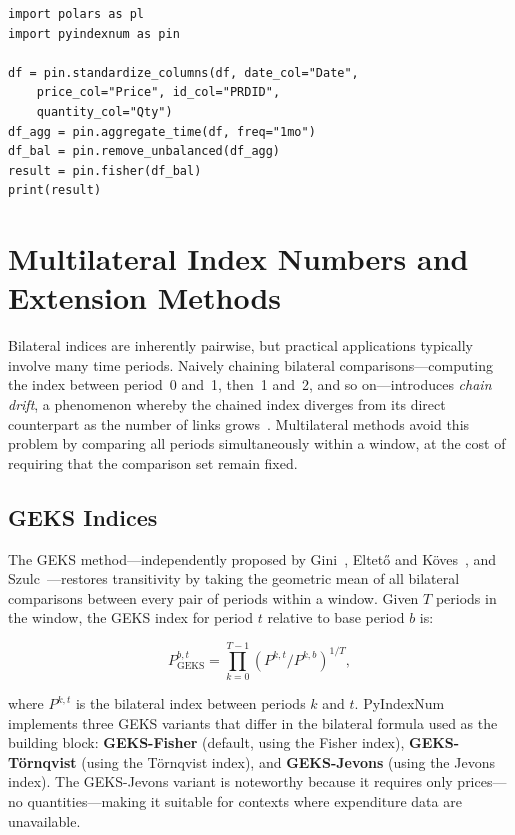 \documentclass[12pt,a4paper]{article}
\begin{document}
\begin{lstlisting}[caption={Computing a bilateral Fisher index}]
import polars as pl
import pyindexnum as pin

df = pin.standardize_columns(df, date_col="Date",
    price_col="Price", id_col="PRDID",
    quantity_col="Qty")
df_agg = pin.aggregate_time(df, freq="1mo")
df_bal = pin.remove_unbalanced(df_agg)
result = pin.fisher(df_bal)
print(result)
\end{lstlisting}

\section{Multilateral Index Numbers and Extension Methods}
\label{sec:multilateral}

Bilateral indices are inherently pairwise, but practical applications typically involve many time periods. Naively chaining bilateral comparisons---computing the index between period~0 and~1, then~1 and~2, and so on---introduces \emph{chain drift}, a phenomenon whereby the chained index diverges from its direct counterpart as the number of links grows~\autocite{vonderlippe2001chain}. Multilateral methods avoid this problem by comparing all periods simultaneously within a window, at the cost of requiring that the comparison set remain fixed.

\subsection{GEKS Indices}

The GEKS method---independently proposed by Gini~\autocite{gini1931circular}, Eltető and Köves~\autocite{elteto1964problem}, and Szulc~\autocite{szulc1964indices}---restores transitivity by taking the geometric mean of all bilateral comparisons between every pair of periods within a window. Given $T$ periods in the window, the GEKS index for period $t$ relative to base period $b$ is:

\[
  P_{\mathrm{GEKS}}^{b,t} = \prod_{k=0}^{T-1} \left( P^{k,t} / P^{k,b} \right)^{1/T},
\]

where $P^{k,t}$ is the bilateral index between periods $k$ and $t$. PyIndexNum implements three GEKS variants that differ in the bilateral formula used as the building block: \textbf{GEKS-Fisher} (default, using the Fisher index), \textbf{GEKS-Törnqvist} (using the Törnqvist index), and \textbf{GEKS-Jevons} (using the Jevons index). The GEKS-Jevons variant is noteworthy because it requires only prices---no quantities---making it suitable for contexts where expenditure data are unavailable.
\end{document}
